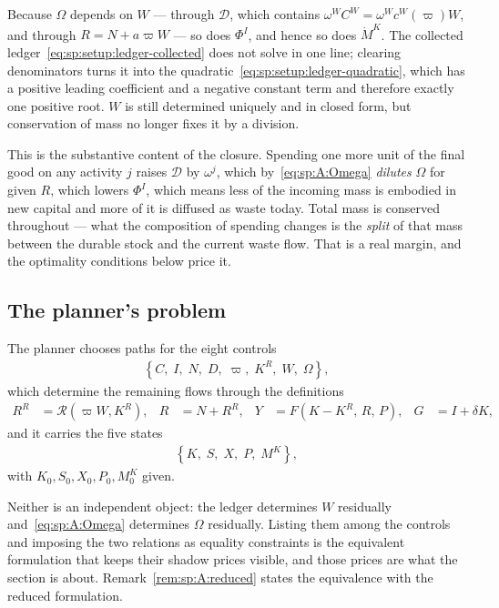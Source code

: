  Because $\Omega$ depends on $W$ --- through
$\mathcal D$, which contains $\omega^WC^W=\omega^Wc^W\left(\varpi\right)W$, and through $R=N+a\varpi W$
--- so does $\Phi^I$, and hence so does $\dot M^K$. The collected
ledger~\eqref{eq:sp:setup:ledger-collected} does not solve in one line; clearing denominators turns it
into the quadratic~\eqref{eq:sp:setup:ledger-quadratic}, which has a positive leading coefficient and a
negative constant term and therefore exactly one positive root. $W$ is still determined uniquely and
in closed form, but conservation of mass no longer fixes it by a division.

 This is the substantive
content of the closure. Spending one more unit of the final good on any activity $j$ raises
$\mathcal D$ by $\omega^j$, which by~\eqref{eq:sp:A:Omega} \emph{dilutes} $\Omega$ for given $R$,
which lowers $\Phi^I$, which means less of the incoming mass is embodied in new capital and more of
it is diffused as waste today. Total mass is conserved throughout --- what the composition of
spending changes is the \emph{split} of that mass between the durable stock and the current waste
flow. That is a real margin, and the optimality conditions below price it.


\subsection{The planner's problem}\label{sec:sp:A:problem}

 The planner chooses paths for the eight controls
\begin{align}
\left\{C,\;I,\;N,\;D,\;\varpi,\;K^R,\;W,\;\Omega\right\},
\label{eq:sp:A:controls}
\end{align}
which determine the remaining flows through the definitions
\begin{align}
R^R &= \mathcal R\left(\varpi W,K^R\right),
&
R &= N+R^R,
&
Y &= F\left(K-K^R,\,R,\,P\right),
&
G &= I+\delta K,
\label{eq:sp:A:definitions}
\end{align}
and it carries the five states
\begin{align}
\left\{K,\;S,\;X,\;P,\;M^K\right\},
\label{eq:sp:A:states}
\end{align}
with $K_0,S_0,X_0,P_0,M^K_0$ given.

 Neither is an independent object: the
ledger determines $W$ residually and~\eqref{eq:sp:A:Omega} determines $\Omega$ residually. Listing
them among the controls and imposing the two relations as equality constraints is the equivalent
formulation that keeps their shadow prices visible, and those prices are what the section is about.
Remark~\ref{rem:sp:A:reduced} states the equivalence with the reduced formulation.

